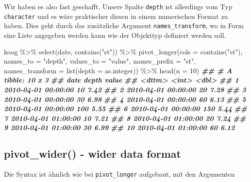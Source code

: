 \documentclass[
]{article}
\newenvironment{Shaded}{\begin{snugshade}}{\end{snugshade}}
\newcommand{\AttributeTok}[1]{\textcolor[rgb]{0.77,0.63,0.00}{#1}}
\newcommand{\DecValTok}[1]{\textcolor[rgb]{0.00,0.00,0.81}{#1}}
\newcommand{\DocumentationTok}[1]{\textcolor[rgb]{0.56,0.35,0.01}{\textbf{\textit{#1}}}}
\newcommand{\FunctionTok}[1]{\textcolor[rgb]{0.00,0.00,0.00}{#1}}
\newcommand{\NormalTok}[1]{#1}
\newcommand{\SpecialCharTok}[1]{\textcolor[rgb]{0.00,0.00,0.00}{#1}}
\newcommand{\StringTok}[1]{\textcolor[rgb]{0.31,0.60,0.02}{#1}}
\begin{document}
Wir haben es also fast geschafft. Unsere Spalte \texttt{depth} ist allerdings vom Typ \texttt{character} und es wäre praktischer diesen in einem numerischen Format zu haben. Dies geht durch das zusätzliche Argument \texttt{names\_transform}, wo in Form eine Liste angegeben werden kann wie der Objekttyp definiert werden soll.

\begin{Shaded}
\begin{Highlighting}[]
\NormalTok{koog }\SpecialCharTok{\%\textgreater{}\%}
  \FunctionTok{select}\NormalTok{(date, }\FunctionTok{contains}\NormalTok{(}\StringTok{"st"}\NormalTok{)) }\SpecialCharTok{\%\textgreater{}\%}
  \FunctionTok{pivot\_longer}\NormalTok{(}\AttributeTok{cols =} \FunctionTok{contains}\NormalTok{(}\StringTok{"st"}\NormalTok{), }\AttributeTok{names\_to =} \StringTok{"depth"}\NormalTok{, }\AttributeTok{values\_to =} \StringTok{"value"}\NormalTok{, }\AttributeTok{names\_prefix =} \StringTok{"st"}\NormalTok{, }\AttributeTok{names\_transform =} \FunctionTok{list}\NormalTok{(}\AttributeTok{depth =}\NormalTok{ as.integer)) }\SpecialCharTok{\%\textgreater{}\%}
  \FunctionTok{head}\NormalTok{(}\AttributeTok{n =} \DecValTok{10}\NormalTok{)}
\DocumentationTok{\#\# \# A tibble: 10 x 3}
\DocumentationTok{\#\#    date                depth value}
\DocumentationTok{\#\#    \textless{}dttm\textgreater{}              \textless{}int\textgreater{} \textless{}dbl\textgreater{}}
\DocumentationTok{\#\#  1 2010{-}04{-}01 00:00:00    10  7.42}
\DocumentationTok{\#\#  2 2010{-}04{-}01 00:00:00    20  7.28}
\DocumentationTok{\#\#  3 2010{-}04{-}01 00:00:00    30  6.98}
\DocumentationTok{\#\#  4 2010{-}04{-}01 00:00:00    60  6.13}
\DocumentationTok{\#\#  5 2010{-}04{-}01 00:00:00   100  5.55}
\DocumentationTok{\#\#  6 2010{-}04{-}01 00:00:00   150  5.44}
\DocumentationTok{\#\#  7 2010{-}04{-}01 01:00:00    10  7.21}
\DocumentationTok{\#\#  8 2010{-}04{-}01 01:00:00    20  7.24}
\DocumentationTok{\#\#  9 2010{-}04{-}01 01:00:00    30  6.99}
\DocumentationTok{\#\# 10 2010{-}04{-}01 01:00:00    60  6.12}
\end{Highlighting}
\end{Shaded}

\hypertarget{pivot_wider---wider-data-format}{%
\subsection{pivot\_wider() - wider data format}\label{pivot_wider---wider-data-format}}

Die Syntax ist ähnlich wie bei \texttt{pivot\_longer} aufgebaut, mit den Argumenten
\end{document}

